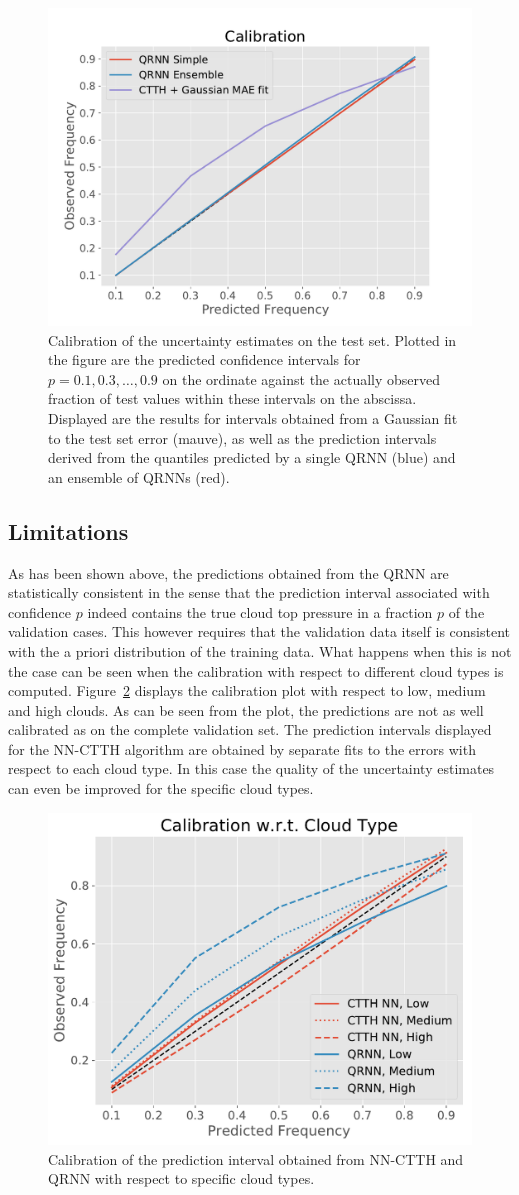 \documentclass[journal abbreviation, manuscript]{copernicus}
\begin{document}
  \begin{figure}[hbpt!]
    \centering
    \includegraphics[width = 0.4\linewidth]{../plots/calibration_1}
    \caption{Calibration of the uncertainty estimates on the test set. Plotted in the
      figure are the predicted confidence intervals for $p = 0.1, 0.3, \ldots,
      0.9$ on the ordinate against the actually observed fraction of test values
      within these intervals on the abscissa. Displayed are the results for
      intervals obtained from a Gaussian fit to the test set error (mauve),
      as well as the prediction intervals derived from the quantiles predicted by a
      single QRNN (blue) and an ensemble of QRNNs (red).}
    \label{fig:calibration}
  \end{figure}

\subsection{Limitations}

As has been shown above, the predictions obtained from the QRNN are statistically
consistent in the sense that the prediction interval associated with confidence
$p$ indeed contains the true cloud top pressure in a fraction $p$ of the validation
cases. This however requires that the validation data itself is consistent with the
a priori distribution of the training data. What happens when this is not the case
can be seen when the calibration with respect to different cloud types is computed.
Figure~\ref{fig:calibration_cloud_type} displays the calibration plot with respect
to low, medium and high clouds. As can be seen from the plot, the predictions are
not as well calibrated as on the complete validation set.
The prediction intervals displayed for the NN-CTTH algorithm are obtained by
separate fits to the errors with respect to each cloud type. In this case the
quality of the uncertainty estimates can  even be improved for the specific
cloud types.


  \begin{figure}[hbpt!]
    \centering
    \includegraphics[width = 0.4\linewidth]{../plots/calibration_cloud_type}
    \caption{Calibration of the prediction interval obtained from NN-CTTH and QRNN
    with respect to specific cloud types.}
    \label{fig:calibration_cloud_type}
  \end{figure}
\end{document}
